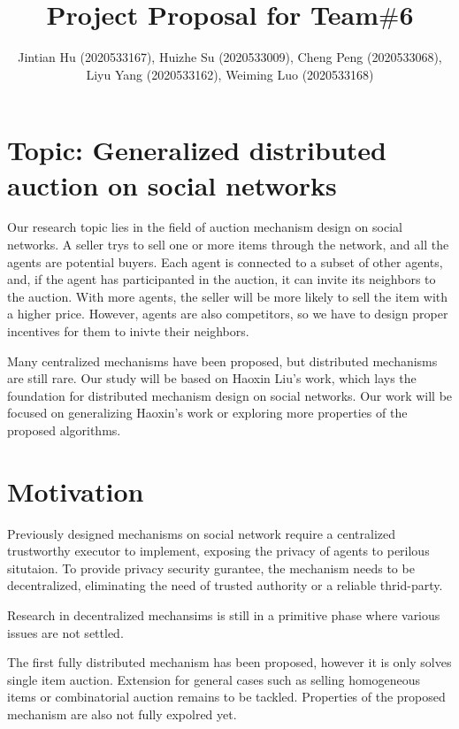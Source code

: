 \documentclass[format=acmsmall, review=false, natbib=false]{acmart}
\title{Project Proposal for Team$\#$6}
\author{Jintian Hu (2020533167), Huizhe Su (2020533009), Cheng Peng (2020533068), Liyu Yang (2020533162), Weiming Luo (2020533168)}
\begin{document}
\maketitle

\section{Topic: Generalized distributed auction on social networks}
Our research topic lies in the field of auction mechanism design on social networks.
A seller trys to sell one or more items through the network, and all the agents are potential buyers.
Each agent is connected to a subset of other agents, and, if the agent has participanted in the auction, 
it can invite its neighbors to the auction. With more agents, the seller will be more likely 
to sell the item with a higher price. However, agents are also competitors, so we have to design proper incentives
for them to inivte their neighbors.\par
Many centralized mechanisms have been proposed, but distributed mechanisms are still rare.
Our study will be based on Haoxin Liu's work, which lays the foundation for 
distributed mechanism design on social networks. Our work will be focused on generalizing Haoxin's work 
or exploring more properties of the proposed algorithms.

\section{Motivation}

Previously designed mechanisms on social network 
require a centralized trustworthy executor to implement, exposing the privacy of agents to perilous situtaion.
To provide privacy security gurantee, the mechanism needs to be decentralized,
eliminating the need of trusted authority or a reliable thrid-party.

Research in decentralized mechansims is still in a primitive phase where various issues are not settled.

The first fully distributed mechanism \cite{liu2023distributed} has been proposed, however it is only solves single item auction.
Extension for general cases such as selling homogeneous items or combinatorial auction remains to be tackled.
Properties of the proposed mechanism are also not fully expolred yet.
\end{document}
